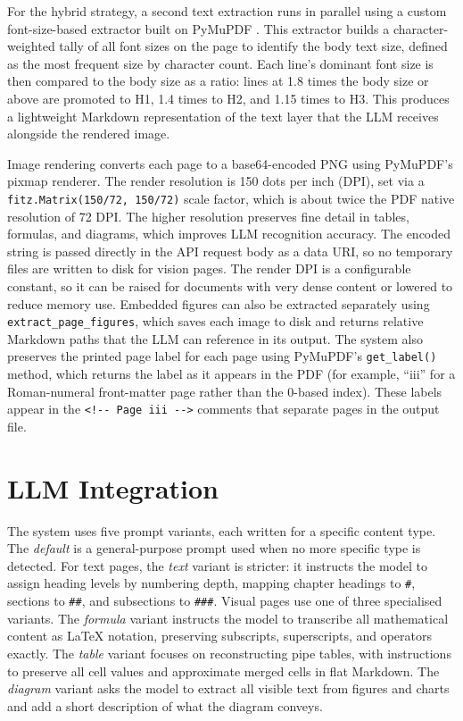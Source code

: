 For the hybrid strategy, a second text extraction runs in parallel using a custom font-size-based extractor built on PyMuPDF \autocite{pymupdf}.
This extractor builds a character-weighted tally of all font sizes on the page to identify the body text size, defined as the most frequent size by character count.
Each line's dominant font size is then compared to the body size as a ratio: lines at 1.8 times the body size or above are promoted to H1, 1.4 times to H2, and 1.15 times to H3.
This produces a lightweight Markdown representation of the text layer that the LLM receives alongside the rendered image.

Image rendering converts each page to a base64-encoded PNG using PyMuPDF's pixmap renderer.
The render resolution is 150 dots per inch (DPI), set via a \texttt{fitz.Matrix(150/72,~150/72)} scale factor, which is about twice the PDF native resolution of 72 DPI.
The higher resolution preserves fine detail in tables, formulas, and diagrams, which improves LLM recognition accuracy.
The encoded string is passed directly in the API request body as a data URI, so no temporary files are written to disk for vision pages.
The render DPI is a configurable constant, so it can be raised for documents with very dense content or lowered to reduce memory use.
Embedded figures can also be extracted separately using \texttt{extract\_page\_figures}, which saves each image to disk and returns relative Markdown paths that the LLM can reference in its output.
The system also preserves the printed page label for each page using PyMuPDF's \texttt{get\_label()} method, which returns the label as it appears in the PDF (for example, ``iii'' for a Roman-numeral front-matter page rather than the 0-based index). These labels appear in the \texttt{<!{-}{-} Page iii -{-}>} comments that separate pages in the output file.

\section{LLM Integration}

The system uses five prompt variants, each written for a specific content type.
The \textit{default} is a general-purpose prompt used when no more specific type
is detected. For text pages, the \textit{text} variant is stricter: it instructs
the model to assign heading levels by numbering depth, mapping chapter headings
to \texttt{\#}, sections to \texttt{\#\#}, and subsections to \texttt{\#\#\#}.
Visual pages use one of three specialised variants. The \textit{formula} variant
instructs the model to transcribe all mathematical content as \LaTeX{} notation,
preserving subscripts, superscripts, and operators exactly. The \textit{table}
variant focuses on reconstructing pipe tables, with instructions to preserve all
cell values and approximate merged cells in flat Markdown. The \textit{diagram}
variant asks the model to extract all visible text from figures and charts and
add a short description of what the diagram conveys.


